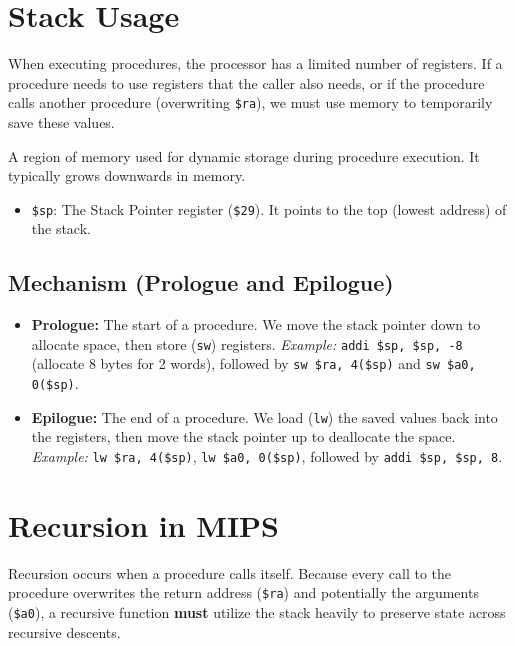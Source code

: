 \section{Stack Usage}

When executing procedures, the processor has a limited number of registers. If a procedure needs to use registers that the caller also needs, or if the procedure calls another procedure (overwriting \texttt{\$ra}), we must use memory to temporarily save these values.

\begin{definition}
A region of memory used for dynamic storage during procedure execution. It typically grows downwards in memory.

\begin{itemize}
    \item \texttt{\$sp}: The Stack Pointer register (\texttt{\$29}). It points to the top (lowest address) of the stack.
\end{itemize}
\end{definition}

\subsection{Mechanism (Prologue and Epilogue)}

\begin{itemize}
    \item \textbf{Prologue:} The start of a procedure. We move the stack pointer down to allocate space, then store (\texttt{sw}) registers. 
    \textit{Example:} \texttt{addi \$sp, \$sp, -8} (allocate 8 bytes for 2 words), followed by \texttt{sw \$ra, 4(\$sp)} and \texttt{sw \$a0, 0(\$sp)}.
    \item \textbf{Epilogue:} The end of a procedure. We load (\texttt{lw}) the saved values back into the registers, then move the stack pointer up to deallocate the space.
    \textit{Example:} \texttt{lw \$ra, 4(\$sp)}, \texttt{lw \$a0, 0(\$sp)}, followed by \texttt{addi \$sp, \$sp, 8}.
\end{itemize}

\section{Recursion in MIPS}

Recursion occurs when a procedure calls itself. Because every call to the procedure overwrites the return address (\texttt{\$ra}) and potentially the arguments (\texttt{\$a0}), a recursive function \textbf{must} utilize the stack heavily to preserve state across recursive descents.

